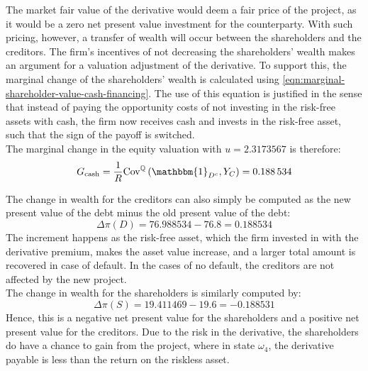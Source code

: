 \documentclass[../main.tex]{subfiles}
\begin{document}
            The market fair value of the derivative would deem a fair price of the project,
            as it would be a zero net present value investment for the counterparty.
            With such pricing, however, a transfer of wealth will occur between the shareholders and the creditors.
            The firm's incentives of not decreasing the shareholders' wealth
            makes an argument for a valuation adjustment of the derivative.
            To support this, the marginal change of the shareholders' wealth is calculated using \cref{eqn:marginal-shareholder-value-cash-financing}.
            The use of this equation is justified in the sense that instead of paying the opportunity costs of not investing in the risk-free assets with cash,
            the firm now receives cash and invests in the risk-free asset,
            such that the sign of the payoff is switched.
            \\
            The marginal change in the equity valuation with $u=\num{2.3173567}$ is therefore:
            \begin{equation}
                G_{\text{cash}} = \discountfactor \text{Cov}^{\rnmeasure}\left(\mathbbm{1}_{D^{c}},Y_{C}\right) = \num{0.188534}
            \end{equation}

            The change in wealth for the creditors can also simply be computed as the new present value of the debt minus the old present value of the debt:
            \begin{equation}
                \Delta \pi(D) = \num{76.988534} - \num{76.8} = \num{0.188534}
            \end{equation}
            The increment happens as the risk-free asset, which the firm invested in with the derivative premium, 
            makes the asset value increase, and a larger total amount is recovered in case of default. 
            In the cases of no default, the creditors are not affected by the new project.\\
            The change in wealth for the shareholders is similarly computed by:
            \begin{equation}
                \Delta \pi(S) = \num{19.411469} - \num{19.6} = \num{-0.188531}
            \end{equation}
            Hence, this is a negative net present value for the shareholders 
            and a positive net present value for the creditors. 
            Due to the risk in the derivative, the shareholders do have a chance to gain from the project, 
            where in state $\omega_4$, the derivative payable is less than the return on the riskless asset.
\end{document}
